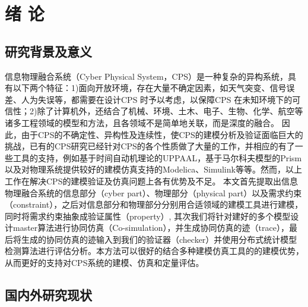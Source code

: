 \chapter{绪\hskip 0.4cm 论}
\label{ch1}

\section{研究背景及意义}

信息物理融合系统（Cyber Physical System，CPS）是一种复杂的异构系统，具有以下两个特征：1)面向开放环境，存在大量不确定因素，如天气突变、信号误差、人为失误等，都需要在设计CPS 时予以考虑，以保障CPS 在未知环境下的可信性；2)除了计算机外，还结合了机械、环境、土木、电子、生物、化学、航空等诸多工程领域的模型和方法，且各领域不是简单地关联，而是深度的融合。
因此，由于CPS的不确定性、异构性及连续性，使CPS的建模分析及验证面临巨大的挑战，已有的CPS研究已经针对CPS的各个性质做了大量的工作，并相应的有了一些工具的支持，例如基于时间自动机理论的UPPAAL，基于马尔科夫模型的Prism以及对物理系统提供较好的建模仿真支持的Modelica、Simulink等等。然而，以上工作在解决CPS的建模验证及仿真问题上各有优势及不足。
本文首先提取出信息物理融合系统的信息部分（cyber part）、物理部分（physical part）以及需求约束（constraint），之后对信息部分和物理部分分别用合适领域的建模工具进行建模，同时将需求约束抽象成验证属性（property）, 其次我们将针对建好的多个模型设计master算法进行协同仿真（Co-simulation），并生成协同仿真的迹（trace），最后将生成的协同仿真的迹输入到我们的验证器（checker）并使用分布式统计模型检测算法进行评估分析。本方法可以很好的结合多种建模仿真工具的的建模优势，从而更好的支持对CPS系统的建模、仿真和定量评估。 


\section{国内外研究现状}

